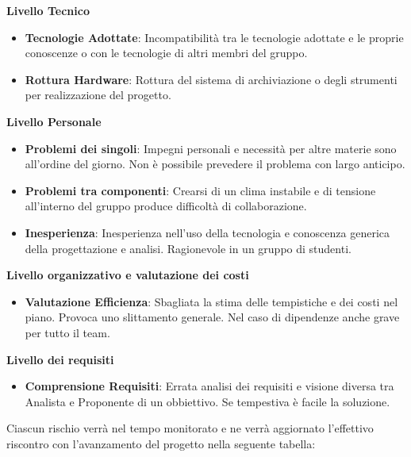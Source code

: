 \documentclass[12pt,a4paper,titlepage]{article}
\begin{document}
\begin{center}
\textbf{Livello Tecnico}
\end{center}
\begin{itemize}
	\item \textbf{Tecnologie Adottate}: Incompatibilità tra le tecnologie adottate e le proprie conoscenze o con le tecnologie di altri membri del gruppo.
	\item \textbf{Rottura Hardware}: Rottura del sistema di archiviazione o degli strumenti per realizzazione del progetto.
\end{itemize}
\begin{center}
	\textbf{Livello Personale}
\end{center}
\begin{itemize}
	\item \textbf{Problemi dei singoli}: Impegni personali e necessità per altre materie sono all'ordine del giorno. Non è possibile prevedere il problema con largo anticipo.
	\item \textbf{Problemi tra componenti}: Crearsi di un clima instabile e di tensione all'interno del gruppo produce difficoltà di collaborazione.
	\item \textbf{Inesperienza}: Inesperienza nell'uso della tecnologia e conoscenza generica della progettazione e analisi. Ragionevole in un gruppo di studenti.
\end{itemize}
\begin{center}
	\textbf{Livello organizzativo e valutazione dei costi}
\end{center}
\begin{itemize}
	\item \textbf{Valutazione Efficienza}: Sbagliata la stima delle tempistiche e dei costi nel piano. Provoca uno slittamento generale. Nel caso di dipendenze anche grave per tutto il team.
\end{itemize}
\begin{center}
	\textbf{Livello dei requisiti}
\end{center}
\begin{itemize}
	\item \textbf{Comprensione Requisiti}: Errata analisi dei requisiti e visione diversa tra Analista e Proponente di un obbiettivo. Se tempestiva è facile la soluzione.
\end{itemize}

Ciascun rischio verrà nel tempo monitorato e ne verrà aggiornato l'effettivo riscontro con l'avanzamento del progetto nella seguente tabella:
\end{document}
